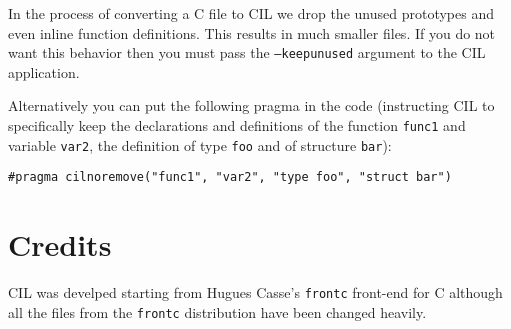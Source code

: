 \documentclass{article}
\newcommand{\t}[1]{{\tt #1}}
\begin{document}
 In the process of converting a C file to CIL we drop the unused prototypes
and even inline function definitions. This results in much smaller files. If
you do not want this behavior then you must pass the \t{--keepunused} argument
to the CIL application. 

 Alternatively you can put the following pragma in the code (instructing CIL
to specifically keep the declarations and definitions of the function
\t{func1} and variable \t{var2}, the definition of type \t{foo} and of
structure \t{bar}):
\begin{verbatim}
#pragma cilnoremove("func1", "var2", "type foo", "struct bar")
\end{verbatim}


\section{Credits}

 CIL was develped starting from Hugues Casse's \t{frontc} front-end for C
although all the files from the \t{frontc} distribution have been changed
heavily. 
 
\end{document}
